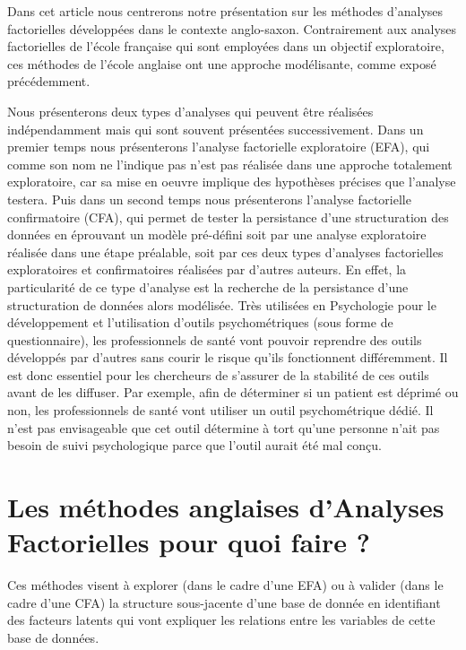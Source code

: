\documentclass[
  french,
  11pt,
  a4paper,
]{article}
\begin{document}
Dans cet article nous centrerons notre présentation sur les méthodes
d'analyses factorielles développées dans le contexte anglo-saxon.
Contrairement aux analyses factorielles de l'école française qui sont
employées dans un objectif exploratoire, ces méthodes de l'école
anglaise ont une approche modélisante, comme exposé précédemment.

Nous présenterons deux types d'analyses qui peuvent être réalisées
indépendamment mais qui sont souvent présentées successivement. Dans un
premier temps nous présenterons l'analyse factorielle exploratoire
(EFA), qui comme son nom ne l'indique pas n'est pas réalisée dans une
approche totalement exploratoire, car sa mise en oeuvre implique des
hypothèses précises que l'analyse testera. Puis dans un second temps
nous présenterons l'analyse factorielle confirmatoire (CFA), qui permet
de tester la persistance d'une structuration des données en éprouvant un
modèle pré-défini soit par une analyse exploratoire réalisée dans une
étape préalable, soit par ces deux types d'analyses factorielles
exploratoires et confirmatoires réalisées par d'autres auteurs. En
effet, la particularité de ce type d'analyse est la recherche de la
persistance d'une structuration de données alors modélisée. Très
utilisées en Psychologie pour le développement et l'utilisation d'outils
psychométriques (sous forme de questionnaire), les professionnels de
santé vont pouvoir reprendre des outils développés par d'autres sans
courir le risque qu'ils fonctionnent différemment. Il est donc essentiel
pour les chercheurs de s'assurer de la stabilité de ces outils avant de
les diffuser. Par exemple, afin de déterminer si un patient est déprimé
ou non, les professionnels de santé vont utiliser un outil
psychométrique dédié. Il n'est pas envisageable que cet outil détermine
à tort qu'une personne n'ait pas besoin de suivi psychologique parce que
l'outil aurait été mal conçu.

\section{Les méthodes anglaises d'Analyses Factorielles pour quoi faire
?}\label{les-muxe9thodes-anglaises-danalyses-factorielles-pour-quoi-faire}

Ces méthodes visent à explorer (dans le cadre d'une EFA) ou à valider
(dans le cadre d'une CFA) la structure sous-jacente d'une base de donnée
en identifiant des facteurs latents qui vont expliquer les relations
entre les variables de cette base de données.
\end{document}
